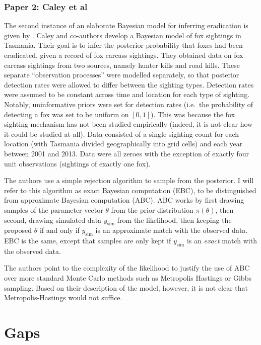 \documentclass[
]{book}
\begin{document}
\hypertarget{paper-2-caley-et-al}{%
\subsubsection{Paper 2: Caley et al}\label{paper-2-caley-et-al}}

The second instance of an elaborate Bayesian model for inferring eradication is given by \citet{caley2015}. Caley and co-authors develop a Bayesian model of fox sightings in Tasmania. Their goal is to infer the posterior probability that foxes had been eradicated, given a record of fox carcass sightings. They obtained data on fox carcass sightings from two sources, namely hunter kills and road kills. These separate ``observation processes'' were modelled separately, so that posterior detection rates were allowed to differ between the sighting types. Detection rates were assumed to be constant across time and location for each type of sighting. Notably, uninformative priors were set for detection rates (i.e.~the probability of detecting a fox was set to be uniform on \([0, 1]\)). This was because the fox sighting mechanism has not been studied empirically (indeed, it is not clear how it could be studied at all). Data consisted of a single sighting count for each location (with Tasmania divided geographically into grid cells) and each year between 2001 and 2013. Data were all zeroes with the exception of exactly four unit observations (sightings of exactly one fox).

The authors use a simple rejection algorithm to sample from the posterior. I will refer to this algorithm as exact Bayesian computation (EBC), to be distinguished from approximate Bayesian computation (ABC). ABC works by first drawing samples of the parameter vector \(\theta\) from the prior distribution \(\pi(\theta)\), then second, drawing simulated data \(y_{\text{sim}}\) from the likelihood, then keeping the proposed \(\theta\) if and only if \(y_{\text{sim}}\) is an approximate match with the observed data. EBC is the same, except that samples are only kept if \(y_{\text{sim}}\) is an \emph{exact} match with the observed data.

The authors point to the complexity of the likelihood to justify the use of ABC over more standard Monte Carlo methods such as Metropolis Hastings or Gibbs sampling. Based on their description of the model, however, it is not clear that Metropolis-Hastings would not suffice.

\hypertarget{gaps}{%
\section{Gaps}\label{gaps}}
\end{document}
